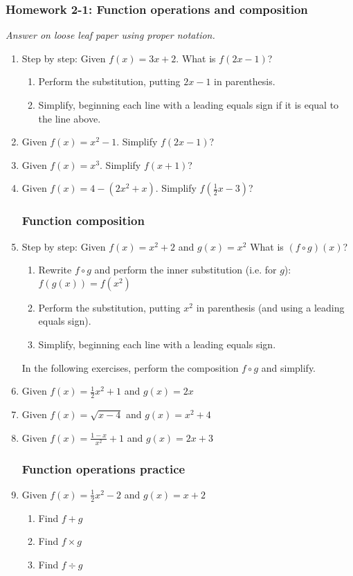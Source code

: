 \documentclass[12pt, oneside]{article}
\begin{document}
\subsubsection*{Homework 2-1: Function operations and composition}
\emph{Answer on loose leaf paper using proper notation.}
  \begin{enumerate}

  \subsubsection*{Function substitution}
  \item Step by step: Given $f(x)=3x+2$. What is $f(2x-1)$?
  \begin{enumerate}
      \item Perform the substitution, putting $2x-1$ in parenthesis.
      \item Simplify, beginning each line with a leading equals sign if it is equal to the line above.
  \end{enumerate}
  \item Given $f(x)=x^2-1$. Simplify $f(2x-1)$?
  \item Given $f(x)=x^3$. Simplify $f(x+1)$?
  \item Given $f(x)=4-(2x^2+x)$. Simplify $f(\frac{1}{2}x-3)$?

  \subsubsection*{Function composition}
  \item Step by step: Given $f(x)=x^2+2$ and $g(x)=x^2$ What is $(f \circ g)(x)$?
  \begin{enumerate}
      \item Rewrite $f \circ g$ and perform the inner substitution (i.e. for $g$): $f(g(x))=f(x^2)$
      \item Perform the substitution, putting $x^2$ in parenthesis (and using a leading equals sign).
      \item Simplify, beginning each line with a leading equals sign.
  \end{enumerate}
  In the following exercises, perform the composition $f \circ g$ and simplify.
  \item Given $f(x)=\frac{1}{2}x^2+1$ and $g(x)=2x$
  \item Given $f(x)=\sqrt{x-4}$ and $g(x)=x^2+4$
  \item Given $\displaystyle f(x)=\frac{1-x}{x^2}+1$ and $g(x)=2x+3$

  \subsubsection*{Function operations practice}
  \item Given $f(x)=\frac{1}{2}x^2-2$ and $g(x)=x+2$
  \begin{enumerate}
      \item Find $f + g$
      \item Find $f \times g$
      \item Find $f \div g$
  \end{enumerate}
  \end{enumerate}
\end{document}
